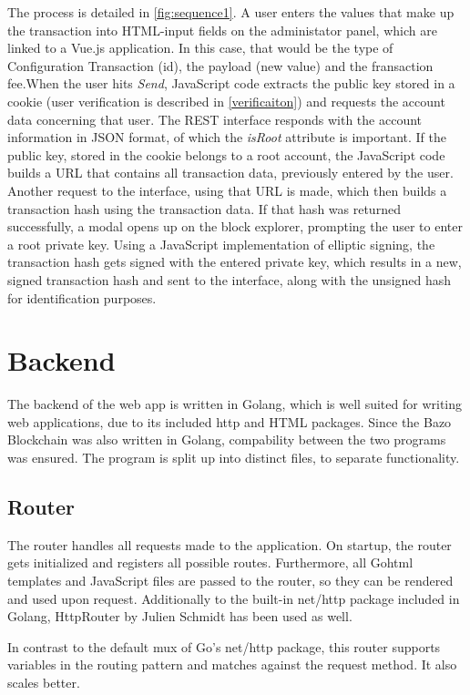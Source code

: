The process is detailed in \ref{fig:sequence1}. A user enters the values that make up the transaction into HTML-input fields on the administator panel, which are linked to a Vue.js application. In this case, that would be the type of Configuration Transaction (id), the payload (new value) and the fransaction fee.When the user hits \emph{Send}, JavaScript code extracts the public key stored in a cookie (user verification is described in \ref{verificaiton}) and requests the account data concerning that user. The REST interface responds with the account information in JSON format, of which the \emph{isRoot} attribute is important. If the public key, stored in the cookie belongs to a root account, the JavaScript code builds a URL that contains all transaction data, previously entered by the user. Another request to the interface, using that URL is made, which then builds a transaction hash using the transaction data. If that hash was returned successfully, a modal opens up on the block explorer, prompting the user to enter a root private key. Using a JavaScript implementation of elliptic signing, the transaction hash gets signed with the entered private key, which results in a new, signed transaction hash and sent to the interface, along with the unsigned hash for identification purposes.


\section{Backend}
The backend of the web app is written in Golang, which is well suited for writing web applications, due to its included http and HTML packages. Since the Bazo Blockchain was also written in Golang, compability between the two programs was ensured. The program is split up into distinct files, to separate functionality. 
\subsection{Router}
The router handles all requests made to the application. On startup, the router gets initialized and registers all possible routes. Furthermore, all Gohtml templates and JavaScript files are passed to the router, so they can be rendered and used upon request.
Additionally to the built-in net/http package included in Golang, HttpRouter by Julien Schmidt has been used as well. 

In contrast to the default mux of Go's net/http package, this router supports variables in the routing pattern and matches against the request method. It also scales better.

